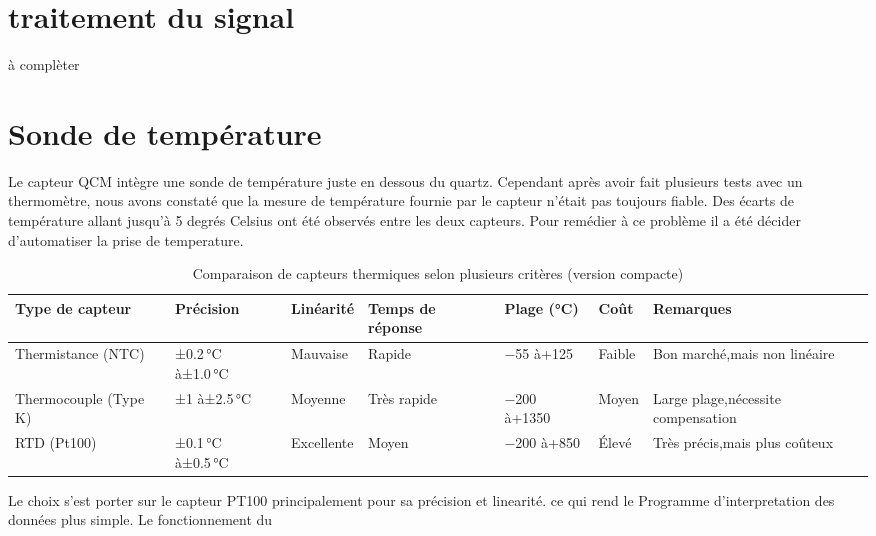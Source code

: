 \section{traitement du signal}
à complèter
\newpage


\section{Sonde de température}
Le capteur QCM intègre une sonde de température juste en dessous du quartz. Cependant après avoir fait plusieurs tests avec un thermomètre, nous avons constaté que la mesure de température fournie par le capteur n'était pas toujours fiable. Des écarts de température allant jusqu'à 5 degrés Celsius ont été observés entre les deux capteurs.
Pour remédier à ce problème il a été décider d'automatiser la prise de temperature.


\begin{table}[h!]
\centering
\begin{tabular}{|p{3.5cm}|p{1.5cm}|p{1.5cm}|p{1.5cm}|p{2.5cm}|p{2cm}|p{3.5cm}|}
\hline
\textbf{Type de capteur} & \textbf{Précision} & \textbf{Linéarité} & \textbf{Temps de réponse} & \textbf{Plage (°C)} & \textbf{Coût} & \textbf{Remarques} \\
\hline
Thermistance (NTC) & ±0.2 °C à\newline ±1.0 °C & Mauvaise & Rapide & −55 à\newline +125 & Faible & Bon marché,\newline mais non linéaire \\
\hline
Thermocouple (Type K) & ±1 à\newline ±2.5 °C & Moyenne & Très rapide & −200 à\newline +1350 & Moyen & Large plage,\newline nécessite compensation \\
\hline
RTD (Pt100) & ±0.1 °C à\newline ±0.5 °C & Excellente & Moyen & −200 à\newline +850 & Élevé & Très précis,\newline mais plus coûteux \\
\hline
\end{tabular}
\caption{Comparaison de capteurs thermiques selon plusieurs critères (version compacte)}
\end{table}

Le choix s'est porter sur le capteur PT100 principalement pour sa précision et linearité. ce qui rend le Programme d'interpretation des données plus simple.
Le fonctionnement du 

